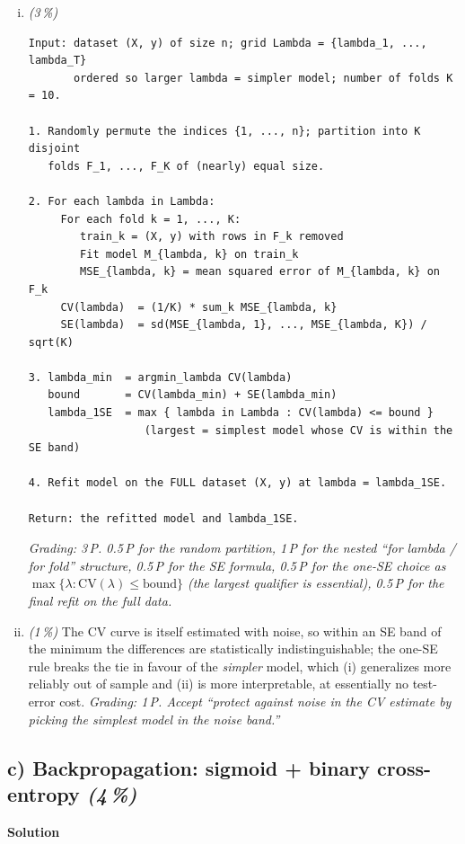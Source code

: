\documentclass[11pt,a4paper]{article}
\newcommand{\subpoints}[1]{\textit{(#1\,\%)}}
\newcommand{\sol}{\noindent\textbf{Solution}}
\begin{document}
\begin{enumerate}[(i)]
  \item \subpoints{3}
\begin{verbatim}
Input: dataset (X, y) of size n; grid Lambda = {lambda_1, ..., lambda_T}
       ordered so larger lambda = simpler model; number of folds K = 10.

1. Randomly permute the indices {1, ..., n}; partition into K disjoint
   folds F_1, ..., F_K of (nearly) equal size.

2. For each lambda in Lambda:
     For each fold k = 1, ..., K:
        train_k = (X, y) with rows in F_k removed
        Fit model M_{lambda, k} on train_k
        MSE_{lambda, k} = mean squared error of M_{lambda, k} on F_k
     CV(lambda)  = (1/K) * sum_k MSE_{lambda, k}
     SE(lambda)  = sd(MSE_{lambda, 1}, ..., MSE_{lambda, K}) / sqrt(K)

3. lambda_min  = argmin_lambda CV(lambda)
   bound       = CV(lambda_min) + SE(lambda_min)
   lambda_1SE  = max { lambda in Lambda : CV(lambda) <= bound }
                  (largest = simplest model whose CV is within the SE band)

4. Refit model on the FULL dataset (X, y) at lambda = lambda_1SE.

Return: the refitted model and lambda_1SE.
\end{verbatim}
        \emph{Grading: 3\,P. 0.5\,P for the random partition, 1\,P for the nested
        ``for lambda / for fold'' structure, 0.5\,P for the SE formula, 0.5\,P for the
        one-SE choice as $\max\{\lambda : \mathrm{CV}(\lambda) \le \text{bound}\}$ (the
        \emph{largest} qualifier is essential), 0.5\,P for the final refit on the full data.}

  \item \subpoints{1} The CV curve is itself estimated with noise, so within an SE band of the
        minimum the differences are statistically indistinguishable; the one-SE rule breaks
        the tie in favour of the \emph{simpler} model, which (i) generalizes more reliably out
        of sample and (ii) is more interpretable, at essentially no test-error cost.
        \emph{Grading: 1\,P. Accept ``protect against noise in the CV estimate by picking the
        simplest model in the noise band.''}
\end{enumerate}

\subsection*{c) Backpropagation: sigmoid + binary cross-entropy \subpoints{4}}
\sol{}
\end{document}
